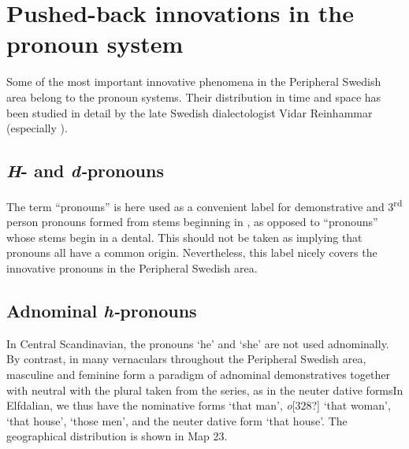 
\section{Pushed-back innovations in the pronoun system}

Some of the most important innovative phenomena in the Peripheral Swedish area belong to the pronoun systems. Their distribution in time and space has been studied in detail by the late Swedish dialectologist Vidar Reinhammar (especially \citet{Reinhammar1975}). 


\subsection{\textit{H}{}- and \textit{d-}pronouns}

The term “pronouns” is here used as a convenient label for demonstrative and 3\textsuperscript{rd} person pronouns formed from stems beginning in , as opposed to “pronouns” whose stems begin in a dental. This should not be taken as implying that pronouns all have a common origin. Nevertheless, this label nicely covers the innovative pronouns in the Peripheral Swedish area.


\subsection{Adnominal \textit{h-}pronouns}

In Central Scandinavian, the pronouns  ‘he’ and  ‘she’ are not used adnominally. By contrast, in many vernaculars throughout the Peripheral Swedish area, masculine  and feminine  form a paradigm of adnominal demonstratives together with neutral with the plural taken from the series, as in the neuter dative formsIn Elfdalian, we thus have the nominative forms  ‘that man’, \textit{o}[328?] ‘that woman’,  ‘that house’,  ‘those men’, and the neuter dative form ‘that house’. The geographical distribution is shown in Map 23. 

